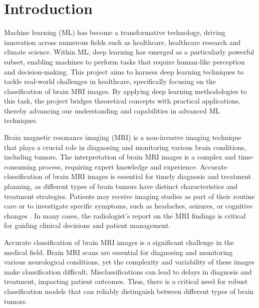 
\section{Introduction}\label{s:introduction}

Machine learning (ML) has become a transformative technology, driving innovation across numerous fields such as healthcare\cite{nazar_systematic_2021}, healthcare research \cite{doupe_machine_2019} and climate science\cite{rolnick_tackling_2022}. Within ML, deep learning has emerged as a particularly powerful subset, enabling machines to perform tasks that require human-like perception and decision-making. This project aims to harness deep learning techniques to tackle real-world challenges in healthcare, specifically focusing on the classification of brain MRI images. By applying deep learning methodologies to this task, the project bridges theoretical concepts with practical applications, thereby advancing our understanding and capabilities in advanced ML techniques.


Brain magnetic resonance imaging (MRI) is a non-invasive imaging technique that plays a crucial role in diagnosing and monitoring various brain conditions, including tumors. The interpretation of brain MRI images is a complex and time-consuming process, requiring expert knowledge and experience. Accurate classification of brain MRI images is essential for timely diagnosis and treatment planning, as different types of brain tumors have distinct characteristics and treatment strategies. Patients may receive imaging studies as part of their routine care or to investigate specific symptoms, such as headaches, seizures, or cognitive changes \cite{lapointe_primary_2018}. In many cases, the radiologist's report on the MRI findings is critical for guiding clinical decisions and patient management.

Accurate classification of brain MRI images is a significant challenge in the medical field. Brain MRI scans are essential for diagnosing and monitoring various neurological conditions, yet the complexity and variability of these images make classification difficult. Misclassifications can lead to delays in diagnosis and treatment, impacting patient outcomes\cite{iorgulescu_misclassification_2019}. Thus, there is a critical need for robust classification models that can reliably distinguish between different types of brain tumors.

